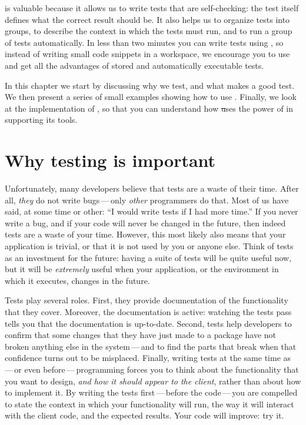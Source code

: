 \documentclass[a4paper,10pt,twoside]{book}
\begin{document}
\sunit is valuable because it allows us to write tests that are self-checking:
the test itself defines what the correct result should be.
It also helps us to
organize tests into groups, to describe the context in which the tests must run, and to
run a group of tests
automatically.  In less than two minutes you can write tests using
\sunit, so instead of writing small code snippets in a workspace, we encourage you
to use \sunit and get all the
advantages of stored and automatically executable tests.

In this chapter we start by discussing why we test, and what makes a good test. We then present a series of small 
examples showing how to use \sunit.
Finally, we look at the implementation of \sunit, so that you can understand how
\st uses the power of  in supporting its tools. 

\section{Why testing is important}

Unfortunately, many developers believe that tests are a waste of their time.  
After all, \emph{they} do not write bugs\,---\,only \emph{other} programmers do that.
Most of us have said, at some time or other:
``I would write tests if I had more time.''
If you never write a bug, and if your code will never be changed in the future,
then indeed tests are a waste of your time.
However, this most likely
also means that your application is trivial, or that it is not used by you or anyone else.  
Think of tests as an investment for the future: having a
suite of tests will be quite useful now, but it will be \emph{extremely} useful when
your application, or the environment in which it executes, changes in the future.

Tests play several roles. First, they provide documentation of the functionality that they cover.  
Moreover, the documentation is active: watching the tests pass tells you that the documentation is up-to-date.
Second,
tests help developers to confirm that some changes that they have just made to a package
have not broken anything else in the system\,---\,and to find the parts that break when that confidence turns out to be misplaced.
Finally, writing tests at the same time as\,---\,or even
before\,---\,programming forces you to think about the functionality
that you want to design, \emph{and how it should appear to the client}, 
rather than about how to implement it.
By writing the tests first\,---\,before the code\,---\,you are compelled to state
the context in which your functionality will run, the way it will
interact with the client code, and the expected results.  
Your code will improve: try it.
\end{document}
